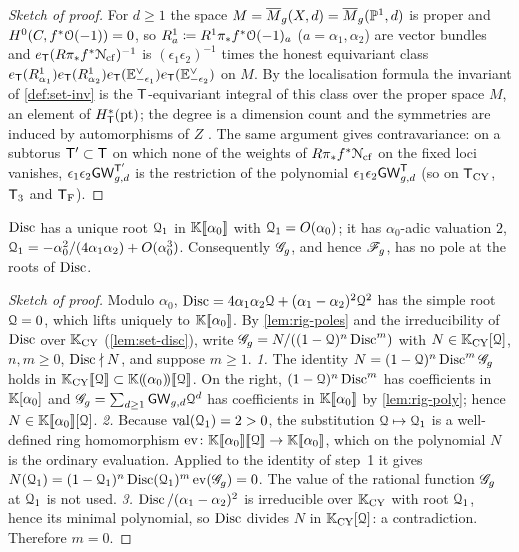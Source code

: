 \begin{proof}[Sketch of proof]
For $d\geq1$ the space $M=\overline{M}_g(X,d)=\overline{M}_g(\mathbb{P}^1,d)$ is proper and $H^0(C,f^*\mathcal{O}(-1))=0$, so $R^1_a\coloneqq R^1\pi_*f^*\mathcal{O}(-1)_a$ ($a=\alpha_1,\alpha_2$) are vector bundles and $e_{\mathsf{T}}(R\pi_*f^*\mathcal{N}_{\mathrm{cf}})^{-1}$ is $(\epsilon_1\epsilon_2)^{-1}$ times the honest equivariant class $e_{\mathsf{T}}(R^1_{\alpha_1})e_{\mathsf{T}}(R^1_{\alpha_2})e_{\mathsf{T}}(\mathbb{E}^\vee_{-\epsilon_1})e_{\mathsf{T}}(\mathbb{E}^\vee_{-\epsilon_2})$ on $M$. By the localisation formula \cite{GP99} the invariant of \cref{def:set-inv} is the $\mathsf{T}$-equivariant integral of this class over the proper space $M$, an element of $H^*_{\mathsf{T}}(\mathrm{pt})$; the degree is a dimension count and the symmetries are induced by automorphisms of $Z$ . The same argument gives contravariance: on a subtorus $\mathsf{T}'\subset\mathsf{T}$ on which none of the weights of $R\pi_*f^*\mathcal{N}_{\mathrm{cf}}$ on the fixed loci vanishes, $\epsilon_1\epsilon_2\mathsf{GW}^{\mathsf{T}'}_{g,d}$ is the restriction of the polynomial $\epsilon_1\epsilon_2\mathsf{GW}^{\mathsf{T}}_{g,d}$ (so on $\mathsf{T}_{\mathrm{CY}}$, $\mathsf{T}_{3}$ and $\mathsf{T}_{\mathrm{F}}$).
\end{proof}

\begin{lem}[{\Lref{Lemmas~7.6 and~7.7}: the small root; no pole on $\Disc=0$}]
\label{lem:rig-disc}
$\operatorname{Disc}$ has a unique root $\mathcal{Q}_1$ in $\mathbb{K}[\![ \alpha_0 ]\!]$ with $\mathcal{Q}_1=O(\alpha_0)$; it has $\alpha_0$-adic valuation $2$, $\mathcal{Q}_1=-\alpha_0^2/(4\alpha_1\alpha_2)+O(\alpha_0^3)$. Consequently $\mathscr{G}_g$, and hence $\mathscr{F}_g$, has no pole at the roots of $\operatorname{Disc}$.
\end{lem}

\begin{proof}[Sketch of proof]
Modulo $\alpha_0$, $\operatorname{Disc}=4\alpha_1\alpha_2\mathcal{Q}+(\alpha_1-\alpha_2)^2\mathcal{Q}^2$ has the simple root $\mathcal{Q}=0$, which lifts uniquely to $\mathbb{K}[\![ \alpha_0 ]\!]$. By \cref{lem:rig-poles} and the irreducibility of $\operatorname{Disc}$ over $\mathbb{K}_{\mathrm{CY}}$ (\cref{lem:set-disc}), write $\mathscr{G}_g=N/((1-\mathcal{Q})^n\operatorname{Disc}^m)$ with $N\in\mathbb{K}_{\mathrm{CY}}[\mathcal{Q}]$, $n,m\geq0$, $\operatorname{Disc}\nmid N$, and suppose $m\geq1$. \emph{1.} The identity $N=(1-\mathcal{Q})^n\operatorname{Disc}^m\mathscr{G}_g$ holds in $\mathbb{K}_{\mathrm{CY}}[\![ \mathcal{Q} ]\!]\subset\mathbb{K}(\!(\alpha_0)\!)[\![ \mathcal{Q} ]\!]$. On the right, $(1-\mathcal{Q})^n\operatorname{Disc}^m$ has coefficients in $\mathbb{K}[\alpha_0]$ and $\mathscr{G}_g=\sum_{d\geq1}\mathsf{GW}_{g,d}\mathcal{Q}^d$ has coefficients in $\mathbb{K}[\![ \alpha_0 ]\!]$ by \cref{lem:rig-poly}; hence $N\in\mathbb{K}[\![ \alpha_0 ]\!][\mathcal{Q}]$. \emph{2.} Because $\operatorname{val}(\mathcal{Q}_1)=2>0$, the substitution $\mathcal{Q}\mapsto\mathcal{Q}_1$ is a well-defined ring homomorphism $\operatorname{ev}\colon\mathbb{K}[\![ \alpha_0 ]\!][\![ \mathcal{Q} ]\!]\to\mathbb{K}[\![ \alpha_0 ]\!]$, which on the polynomial $N$ is the ordinary evaluation. Applied to the identity of step~1 it gives $N(\mathcal{Q}_1)=(1-\mathcal{Q}_1)^n\operatorname{Disc}(\mathcal{Q}_1)^m\operatorname{ev}(\mathscr{G}_g)=0$. The value of the rational function $\mathscr{G}_g$ at $\mathcal{Q}_1$ is not used. \emph{3.} $\operatorname{Disc}/(\alpha_1-\alpha_2)^2$ is irreducible over $\mathbb{K}_{\mathrm{CY}}$ with root $\mathcal{Q}_1$, hence its minimal polynomial, so $\operatorname{Disc}$ divides $N$ in $\mathbb{K}_{\mathrm{CY}}[\mathcal{Q}]$: a contradiction. Therefore $m=0$.
\end{proof}


